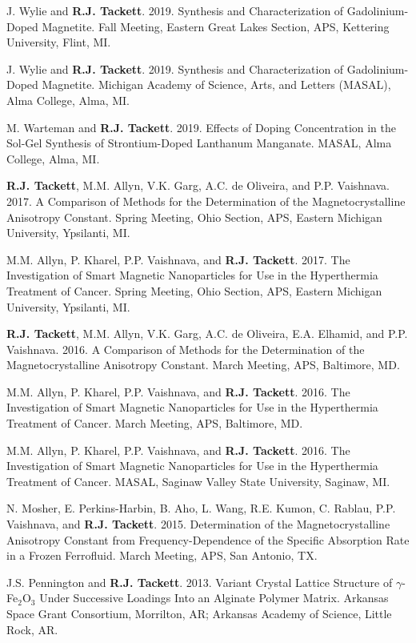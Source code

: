 \documentclass[10pt]{article}
\begin{document}

\begin{reflist}
\item J. Wylie and \textbf{R.J. Tackett}. 2019. Synthesis and Characterization of Gadolinium-Doped Magnetite. Fall Meeting, Eastern Great Lakes Section, APS, Kettering University, Flint, MI.
\item J. Wylie and \textbf{R.J. Tackett}. 2019. Synthesis and Characterization of Gadolinium-Doped Magnetite. Michigan Academy of Science, Arts, and Letters (MASAL), Alma College, Alma, MI.
\item M. Warteman and \textbf{R.J. Tackett}. 2019. Effects of Doping Concentration in the Sol-Gel Synthesis of Strontium-Doped Lanthanum Manganate. MASAL, Alma College, Alma, MI.
\item \textbf{R.J. Tackett}, M.M. Allyn, V.K. Garg, A.C. de Oliveira, and P.P. Vaishnava. 2017. A Comparison of Methods for the Determination of the Magnetocrystalline Anisotropy Constant. Spring Meeting, Ohio Section, APS, Eastern Michigan University, Ypsilanti, MI.
\item M.M. Allyn, P. Kharel, P.P. Vaishnava, and \textbf{R.J. Tackett}. 2017. The Investigation of Smart Magnetic Nanoparticles for Use in the Hyperthermia Treatment of Cancer. Spring Meeting, Ohio Section, APS, Eastern Michigan University, Ypsilanti, MI.
\item \textbf{R.J. Tackett}, M.M. Allyn, V.K. Garg, A.C. de Oliveira, E.A. Elhamid, and P.P. Vaishnava. 2016. A Comparison of Methods for the Determination of the Magnetocrystalline Anisotropy Constant. March Meeting, APS, Baltimore, MD.
\item M.M. Allyn, P. Kharel, P.P. Vaishnava, and \textbf{R.J. Tackett}. 2016. The Investigation of Smart Magnetic Nanoparticles for Use in the Hyperthermia Treatment of Cancer. March Meeting, APS, Baltimore, MD.
\item M.M. Allyn, P. Kharel, P.P. Vaishnava, and \textbf{R.J. Tackett}. 2016. The Investigation of Smart Magnetic Nanoparticles for Use in the Hyperthermia Treatment of Cancer. MASAL, Saginaw Valley State University, Saginaw, MI.
\item N. Mosher, E. Perkins-Harbin, B. Aho, L. Wang, R.E. Kumon, C. Rablau, P.P. Vaishnava, and \textbf{R.J. Tackett}. 2015. Determination of the Magnetocrystalline Anisotropy Constant from Frequency-Dependence of the Specific Absorption Rate in a Frozen Ferrofluid. March Meeting, APS, San Antonio, TX.
\item J.S. Pennington and \textbf{R.J. Tackett}. 2013. Variant Crystal Lattice Structure of $\gamma$-Fe$_2$O$_3$ Under Successive Loadings Into an Alginate Polymer Matrix. Arkansas Space Grant Consortium, Morrilton, AR; Arkansas Academy of Science, Little Rock, AR.

\end{reflist}
\end{document}
